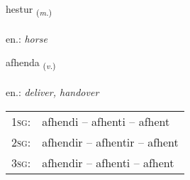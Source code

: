 \documentclass[frontgrid, backgrid]{flacards}\usepackage[]{graphicx}\usepackage[]{xcolor}
\begin{document}
\renewcommand{\flhead}{\vskip5pt \fboxsep=0pt {\small\bfseries\footnotesize Nafnorð | Noun}}
\renewcommand{\fcfoot}{\vskip5pt \fboxsep=0pt \hspace{2pt}{\small\bfseries\footnotesize 2K}}

\renewcommand{\blhead}{\vskip5pt {\small\bfseries\footnotesize Nafnorð | Noun }}
\renewcommand{\bcfoot}{\vskip5pt \hspace{2pt}{\small\bfseries\footnotesize 2K}}


{hestur \small{\textsubscript{(\textit{m.})}} \\[1ex] %
\textphonetic{[hɛstʏr]} \\
en.: \emph{horse} \\  [2ex]
\renewcommand*{\arraystretch}{0.8}
}

\renewcommand{\flhead}{\vskip5pt \fboxsep=0pt {\small\bfseries\footnotesize Sagnorð | Verb}}
\renewcommand{\fcfoot}{\vskip5pt \fboxsep=0pt \hspace{2pt}{\small\bfseries\footnotesize 2K}}

\renewcommand{\blhead}{\vskip5pt {\small\bfseries\footnotesize Sagnorð | Verb }}
\renewcommand{\bcfoot}{\vskip5pt \hspace{2pt}{\small\bfseries\footnotesize 2K}}


{afhenda \small{\textsubscript{(\textit{v.})}} \\[1ex] %
\textphonetic{[afhɛnta]} \\
en.: \emph{deliver, handover} \\  [2ex]
\renewcommand*{\arraystretch}{0.8}
\begin{tabular}{p{1cm}l}
\textsc{1sg}: & afhendi -- afhenti -- afhent \\ 
\textsc{2sg}: & afhendir -- afhentir -- afhent \\ 
\textsc{3sg}: & afhendir -- afhenti -- afhent \\ 
\end{tabular}
}
\end{document}
